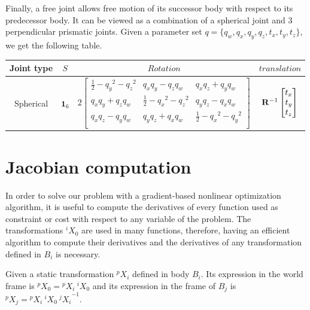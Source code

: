 Finally, a free joint allows free motion of its successor body with respect to its predecessor body.
It can be viewed as a combination of a spherical joint and 3 perpendicular prismatic joints.
Given a parameter set $q = \{ q_w, q_x, q_y, q_z, t_x, t_y, t_z\}$, we get the following table.

\begin{tabular}{cccc}
  \toprule
  Joint type & $S$ & $Rotation$ & $translation$ \\
  \midrule
  Spherical
  &
  $\mathbf{1}_6$
  &
  $2 \begin{bmatrix}
    \frac{1}{2} - {q_y}^2 - {q_z}^2 &	q_x q_y - q_z q_w &	q_x q_z + q_y q_w \\
    q_x q_y + q_z q_w	& \frac{1}{2} - {q_x}^2 - {q_z}^2 &	q_y q_z - q_x q_w \\
    q_x q_z - q_y q_w &	q_y q_z + q_x q_w	& \frac{1}{2} - {q_x}^2 - {q_y}^2 \\
  \end{bmatrix}$
  &
  ${\bf R}^{-1}\begin{bmatrix}
    t_x \\ t_y \\ t_z
  \end{bmatrix}$
  \\
  \bottomrule
\end{tabular}



\section{Jacobian computation}
\label{sec:jacobian_computation}


In order to solve our problem with a gradient-based nonlinear optimization algorithm, it is useful to compute the derivatives of every function used as constraint or cost with respect to any variable of the problem.
The transformations ${}^i X_0$ are used in many functions, therefore, having an efficient algorithm to compute their derivatives and the derivatives of any transformation defined in $B_i$ is necessary.

Given a static transformation ${}^p X_i$ defined in body $B_i$.
Its expression in the world frame is ${}^p X_0 = {}^p X_i\ {}^i X_0$ and its expression in the frame of $B_j$ is ${}^p X_j = {}^p X_i\ {}^i X_0\ {{}^j X_i}^{-1}$.

